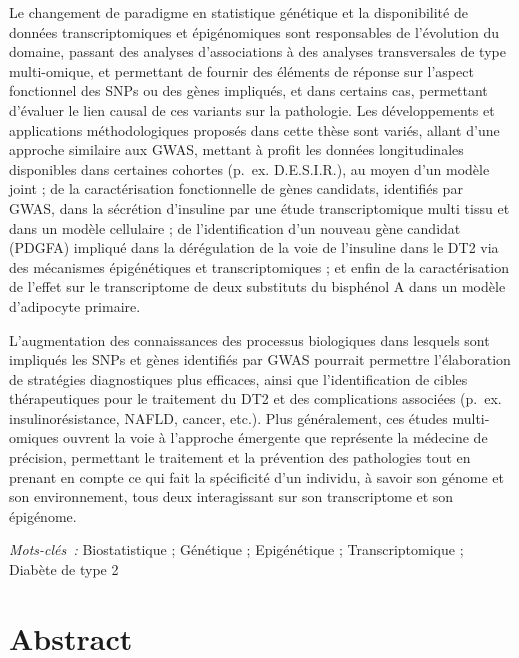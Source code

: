 \documentclass[11pt,a4paper,notrimn]{krantz}
\theoremstyle{definition}
\theoremstyle{definition}
\theoremstyle{remark}
\begin{document}
Le changement de paradigme en statistique génétique et la disponibilité
de données transcriptomiques et épigénomiques sont responsables de
l'évolution du domaine, passant des analyses d'associations à des
analyses transversales de type multi-omique, et permettant de fournir
des éléments de réponse sur l'aspect fonctionnel des SNPs ou des gènes
impliqués, et dans certains cas, permettant d'évaluer le lien causal de
ces variants sur la pathologie. Les développements et applications
méthodologiques proposés dans cette thèse sont variés, allant d'une
approche similaire aux GWAS, mettant à profit les données longitudinales
disponibles dans certaines cohortes (p.~ex. D.E.S.I.R.), au moyen d'un
modèle joint ; de la caractérisation fonctionnelle de gènes candidats,
identifiés par GWAS, dans la sécrétion d'insuline par une étude
transcriptomique multi tissu et dans un modèle cellulaire ; de
l'identification d'un nouveau gène candidat (PDGFA) impliqué dans la
dérégulation de la voie de l'insuline dans le DT2 via des mécanismes
épigénétiques et transcriptomiques ; et enfin de la caractérisation de
l'effet sur le transcriptome de deux substituts du bisphénol A dans un
modèle d'adipocyte primaire.

L'augmentation des connaissances des processus biologiques dans lesquels
sont impliqués les SNPs et gènes identifiés par GWAS pourrait permettre
l'élaboration de stratégies diagnostiques plus efficaces, ainsi que
l'identification de cibles thérapeutiques pour le traitement du DT2 et
des complications associées (p.~ex. insulinorésistance, NAFLD, cancer,
etc.). Plus généralement, ces études multi-omiques ouvrent la voie à
l'approche émergente que représente la médecine de précision, permettant
le traitement et la prévention des pathologies tout en prenant en compte
ce qui fait la spécificité d'un individu, à savoir son génome et son
environnement, tous deux interagissant sur son transcriptome et son
épigénome.

\emph{Mots-clés~:} Biostatistique ; Génétique ; Epigénétique ;
Transcriptomique ; Diabète de type 2

\normalsize {}

\chapter*{Abstract}\label{abstract}
\end{document}
